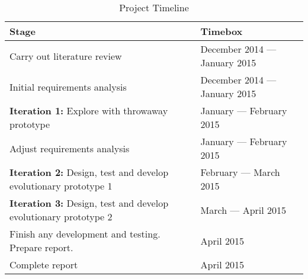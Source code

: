 \begin{table}[h]
\begin{tabular}{|p{3.4in}|p{1.5in}|}
\hline
\textbf{Stage}                                                          & \textbf{Timebox}             \\ \hline
Carry out literature review                                             & December 2014 --- \newline January 2015 \\ \hline
Initial requirements analysis                                           & December 2014 --- \newline January 2015 \\ \hline
\textbf{Iteration 1:} Explore with throwaway prototype                  & January --- \newline February 2015      \\ \hline
Adjust requirements analysis                                            & January --- \newline February 2015      \\ \hline
\textbf{Iteration 2:} Design, test and develop evolutionary prototype 1 & February --- \newline March 2015        \\ \hline
\textbf{Iteration 3:} Design, test and develop evolutionary prototype 2 & March --- \newline April 2015           \\ \hline
Finish any development and testing. Prepare report.                     & April 2015                   \\ \hline
Complete report                                                         & April 2015                   \\ \hline
\end{tabular}
\caption{Project Timeline \protect {\label{tab:project_timeline}}}
\end{table}